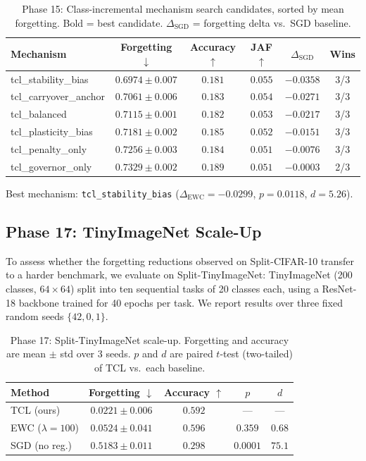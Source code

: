 \begin{table}[h]
\centering
\caption{Phase 15: Class-incremental mechanism search candidates, sorted by mean forgetting.
Bold = best candidate. $\Delta_\text{SGD}$ = forgetting delta vs.\ SGD baseline.}
\label{tab:class-inc}
\begin{tabular}{lccccc}
\toprule
Mechanism & Forgetting $\downarrow$ & Accuracy $\uparrow$ & JAF $\uparrow$ & $\Delta_\text{SGD}$ & Wins \\
\midrule
tcl\_stability\_bias & $\mathbf{0.6974 \pm 0.007}$ & $0.181$ & $0.055$ & $-0.0358$ & 3/3 \\
tcl\_carryover\_anchor & $0.7061 \pm 0.006$ & $0.183$ & $0.054$ & $-0.0271$ & 3/3 \\
tcl\_balanced & $0.7115 \pm 0.001$ & $0.182$ & $0.053$ & $-0.0217$ & 3/3 \\
tcl\_plasticity\_bias & $0.7181 \pm 0.002$ & $0.185$ & $0.052$ & $-0.0151$ & 3/3 \\
tcl\_penalty\_only & $0.7256 \pm 0.003$ & $0.184$ & $0.051$ & $-0.0076$ & 3/3 \\
tcl\_governor\_only & $0.7329 \pm 0.002$ & $0.189$ & $0.051$ & $-0.0003$ & 2/3 \\
\bottomrule
\end{tabular}
\end{table}

Best mechanism: \texttt{tcl\_stability\_bias} ($\Delta_\text{EWC} = -0.0299$,
$p = 0.0118$, $d = 5.26$).

\subsection{Phase 17: TinyImageNet Scale-Up}
\label{sec:tinyimagenet}

To assess whether the forgetting reductions observed on Split-CIFAR-10 transfer
to a harder benchmark, we evaluate on Split-TinyImageNet: TinyImageNet
(200 classes, $64\times64$) split into ten sequential tasks of 20 classes each,
using a ResNet-18 backbone trained for 40 epochs per task.
We report results over three fixed random seeds $\{42, 0, 1\}$.

\begin{table}[h]
\centering
\caption{Phase 17: Split-TinyImageNet scale-up. Forgetting and accuracy are
mean $\pm$ std over 3 seeds. $p$ and $d$ are paired $t$-test (two-tailed)
of TCL vs.\ each baseline.}
\label{tab:tinyimagenet}
\begin{tabular}{lcccc}
\toprule
Method & Forgetting $\downarrow$ & Accuracy $\uparrow$ & $p$ & $d$ \\
\midrule
TCL (ours)   & $\mathbf{0.0221 \pm 0.006}$ & $0.592$ & --- & --- \\
EWC ($\lambda=100$) & $0.0524 \pm 0.041$ & $0.596$ & $0.359$ & $0.68$ \\
SGD (no reg.) & $0.5183 \pm 0.011$ & $0.298$ & $0.0001$ & $75.1$ \\
\bottomrule
\end{tabular}
\end{table}


